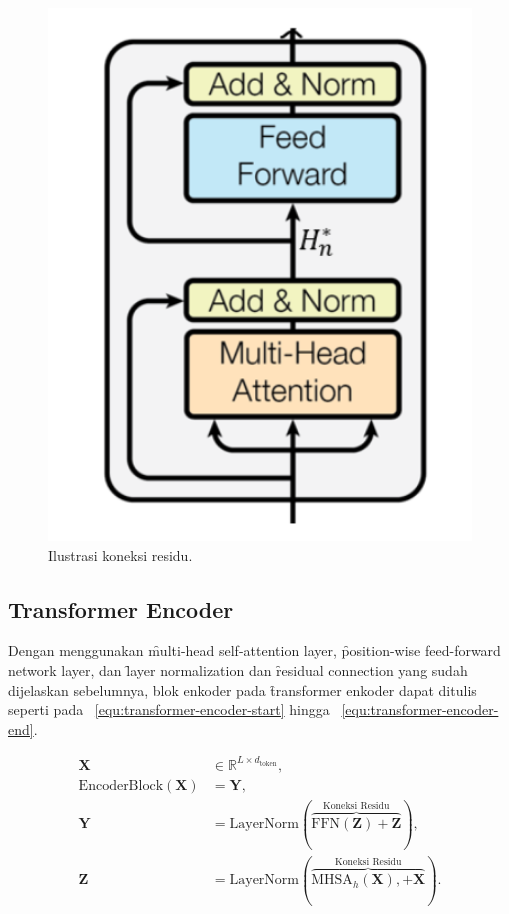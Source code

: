 	\begin{figure}
		\centering
		\includegraphics[width=1\textwidth]{assets/pics/residual-connection-transformer.png}
		\caption{Ilustrasi koneksi residu.}
		\label{fig:residual-connection-transformers}
	\end{figure}

	\subsection{Transformer Encoder}
	\label{sec:encoder}

	Dengan menggunakan \f{multi-head self-attention layer}, \f{position-wise feed-forward network layer}, dan \f{layer normalization} dan \f{residual connection} yang sudah dijelaskan sebelumnya, blok enkoder pada \f{transformer} enkoder dapat ditulis seperti pada \equ~\ref{equ:transformer-encoder-start} hingga \equ~\ref{equ:transformer-encoder-end}.
			
	\begin{align}
	\mathbf{X} &\in \mathbb{R}^{L \times d_{\text{token}}}, \\
	\text{EncoderBlock}(\mathbf{X}) &= \mathbf{Y}, \\
	\mathbf{Y} &= \text{LayerNorm}(\overbrace{\text{FFN}(\mathbf{Z})+\mathbf{Z}}^{\text{Koneksi Residu}}), \\
	\mathbf{Z} &= \text{LayerNorm}(\overbrace{\text{MHSA}_h(\mathbf{X}), + \mathbf{X}}^{\text{Koneksi Residu}}). \\
	\end{align}


